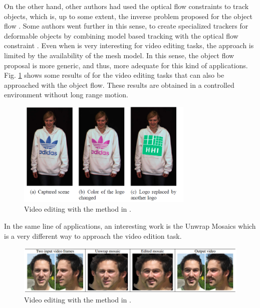 On the other hand, other authors had used the optical flow constraints to track objects, 
which is, up to some extent, the inverse problem proposed for the object flow \cite{c37}. Some authors went further in this sense, to create specialized trackers 
for deformable objects by combining model based tracking with the optical flow constraint \cite{c38}. Even when \cite{c38} is very interesting for video editing 
tasks, the approach is limited by the availability of the mesh model. In this sense, the object flow proposal is more generic, and thus, more adequate for this kind 
of applications. Fig. \ref{soa1} shows some results of \cite{c38} for the video editing tasks that can also be approached with the object flow. These results are obtained in 
a controlled environment without long range motion.

   \begin{figure}[thpb]
      \centering
      \includegraphics[width=0.75\textwidth]{../images/soa_app.png}
      \caption{  Video editing with the method in  \cite{c38}. }
      \label{soa1}
   \end{figure}

In the same line of applications, an interesting work is the Unwrap Mosaics \cite{c41} which is a very different way to approach the video edition task. 

   \begin{figure}[thpb]
      \centering
      \includegraphics[width=1.00\textwidth]{../images/soa_app2.png}
      \caption{  Video editing with the method in  \cite{c41}. }
      \label{soa2}
   \end{figure}

